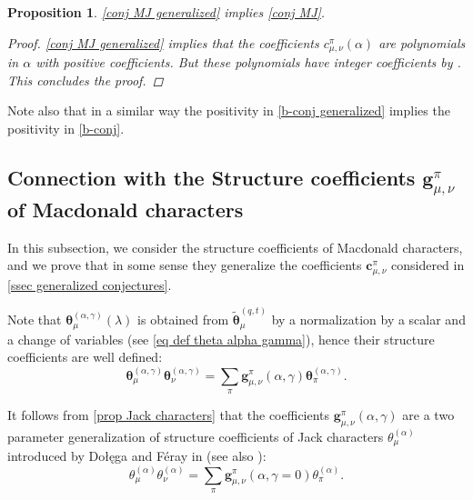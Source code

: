 \documentclass[12pt]{amsart}
\newtheorem{prop}[thm]{Proposition}
\theoremstyle{remark}
\newcommand{\bfc}{\boldsymbol{c}}
\newcommand{\bfg}{\boldsymbol{g}}
\newcommand{\Jch}{\theta^{(\alpha)}}
\newcommand{\MchJack}{{\boldsymbol{\theta}}^{(\alpha,\gamma)}}
\newcommand{\Mch}{\boldsymbol{\widetilde\theta}^{(q,t)}}
\begin{document}
\begin{prop}
    \cref{conj MJ generalized} implies \cref{conj MJ}.
\begin{proof}
     \cref{conj MJ generalized} implies that the coefficients $c^\pi_{\mu,\nu}(\alpha)$ are polynomials in $\alpha$ with positive coefficients. But  these polynomials have integer coefficients by \cite{BenDali2023}. This concludes the proof. 
\end{proof}
\end{prop}

Note also that in a similar way the positivity in \cref{b-conj  generalized} implies the positivity in \cref{b-conj}.

\subsection{Connection with the Structure coefficients \texorpdfstring{$\bfg^\pi_{\mu,\nu}$}{} of Macdonald characters}\label{ssec structure coefficients}
In this subsection, we consider the structure coefficients of Macdonald characters, and we prove that in some sense they generalize the coefficients $\bfc^\pi_{\mu,\nu}$ considered in \cref{ssec generalized conjectures}.

Note that $\MchJack_\mu(\lambda)$ is obtained from $\Mch_\mu$ by a normalization by a scalar and a change of variables (see \cref{eq def theta alpha gamma}), hence their structure coefficients are well defined:
 \begin{equation}\label{eq structure coefficients}
  \MchJack_\mu\MchJack_\nu=\sum_{\pi}\bfg^\pi_{\mu,\nu}(\alpha,\gamma)\MchJack_\pi.   
 \end{equation}

It follows from \cref{prop Jack characters} that the coefficients $\bfg^\pi_{\mu,\nu}(\alpha,\gamma)$ are a two parameter generalization of structure coefficients of Jack characters $\Jch_\mu$ introduced by Do\l{}e\k{}ga and Féray in \cite{DolegaFeray2016} (see also \cite{Sniady2019}):
$$\Jch_\mu\Jch_\nu=\sum_{\pi}\bfg^\pi_{\mu,\nu}(\alpha,\gamma=0)\Jch_\pi.$$
\end{document}
